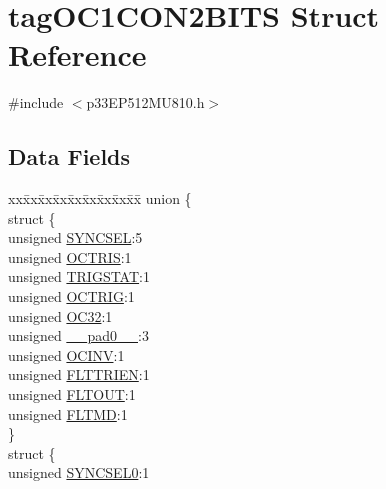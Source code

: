 \hypertarget{structtag_o_c1_c_o_n2_b_i_t_s}{}\section{tag\+O\+C1\+C\+O\+N2\+B\+I\+TS Struct Reference}
\label{structtag_o_c1_c_o_n2_b_i_t_s}


{\ttfamily \#include $<$p33\+E\+P512\+M\+U810.\+h$>$}

\subsection*{Data Fields}
\begin{DoxyCompactItemize}
\item 
\begin{tabbing}
xx\=xx\=xx\=xx\=xx\=xx\=xx\=xx\=xx\=\kill
union \{\\
\>struct \{\\
\>\>unsigned \hyperlink{structtag_o_c1_c_o_n2_b_i_t_s_a35fbbe11485c2615ed27535b62c3fa35}{SYNCSEL}:5\\
\>\>unsigned \hyperlink{structtag_o_c1_c_o_n2_b_i_t_s_ab849a74c6179282ed6b06cc047c80544}{OCTRIS}:1\\
\>\>unsigned \hyperlink{structtag_o_c1_c_o_n2_b_i_t_s_ab379549de54ac93ad4aa73686c34cb7c}{TRIGSTAT}:1\\
\>\>unsigned \hyperlink{structtag_o_c1_c_o_n2_b_i_t_s_a8d2cf9b996ef2b9079defa8950de798c}{OCTRIG}:1\\
\>\>unsigned \hyperlink{structtag_o_c1_c_o_n2_b_i_t_s_af52e127483a703e0fa84c7d4f1de0df4}{OC32}:1\\
\>\>unsigned \hyperlink{structtag_o_c1_c_o_n2_b_i_t_s_adf71f3d8410c1f1dbbc96680a92c49af}{\_\_pad0\_\_}:3\\
\>\>unsigned \hyperlink{structtag_o_c1_c_o_n2_b_i_t_s_a301004fca40c8d19d418866c92c19a06}{OCINV}:1\\
\>\>unsigned \hyperlink{structtag_o_c1_c_o_n2_b_i_t_s_ab979b75e02643aa840fb6ee50e0c30fa}{FLTTRIEN}:1\\
\>\>unsigned \hyperlink{structtag_o_c1_c_o_n2_b_i_t_s_ae466664b094d9c830e9ce20b86d7907f}{FLTOUT}:1\\
\>\>unsigned \hyperlink{structtag_o_c1_c_o_n2_b_i_t_s_a245ca3019d6c6ccbfb09f1c821146bb5}{FLTMD}:1\\
\>\} \\
\>struct \{\\
\>\>unsigned \hyperlink{structtag_o_c1_c_o_n2_b_i_t_s_a3b5df3154fde5141e6ac0156425ff8b4}{SYNCSEL0}:1\\

\end{tabbing}
\end{DoxyCompactItemize}
